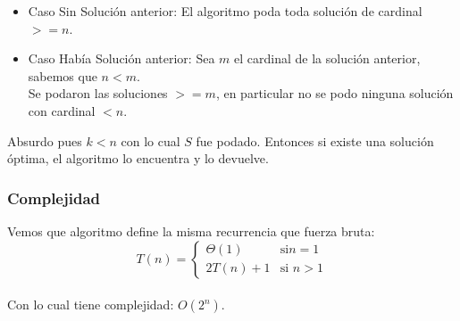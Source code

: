 \begin{itemize}
	\item Caso Sin Soluci\'on anterior: El algoritmo poda toda soluci\'on de cardinal $>= n$.
	\item Caso Hab\'ia Soluci\'on anterior: Sea $m$ el cardinal de la soluci\'on anterior, sabemos que $n < m$.\\
	Se podaron las soluciones $>= m$, en particular no se podo ninguna soluci\'on con cardinal $< n$.\\
\end{itemize}	
Absurdo pues $k < n$ con lo cual $S$ fue podado.
Entonces si existe una soluci\'on \'optima, el algoritmo lo encuentra y lo devuelve.
\subsubsection{Complejidad}
Vemos que algoritmo define la misma recurrencia que fuerza bruta:\\
$$
T(n) = \left\{
\begin{array}{cl}
 \Theta (1) &\mbox{si
} n = 1 \\
2T(n)+1&\mbox{si } n > 1
\end{array}\right.
$$
\\
Con lo cual tiene complejidad: $O(2^{n})$.\\